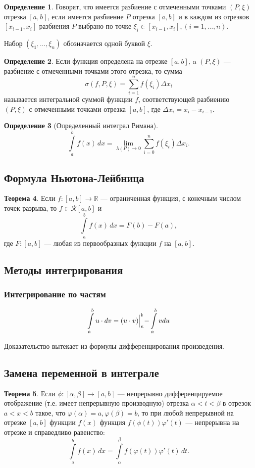 \documentclass[12pt]{report}
\theoremstyle{definition}
\newtheorem{theorem}{Теорема}[chapter]
\newtheorem{definition}[theorem]{Определение}
\newcommand{\R}{\mathbb R}
\newcommand{\Ri}{\mathcal R}
\begin{document}
\begin{definition}
Говорят, что имеется разбиение с отмеченными точками $(P, \xi)$ отрезка $[a, b]$,
если имеется разбиение $P$ отрезка $[a, b]$ и в каждом из отрезков $[x_{i-1}, x_i]$
разбиения $P$ выбрано по точке $\xi_i \in [x_{i-1}, x_i], (i=1, \dots, n)$.

Набор $(\xi_1, \dots, \xi_n)$ обозначается одной буквой $\xi$.
\end{definition}

\begin{definition}
Если функция определена на отрезке $[a, b]$, a $(P, \xi)$ --- разбиение с отмеченными
точками этого отрезка, то сумма
$$
\sigma(f, P, \xi) = \sum\limits_{i=1}^{n} f(\xi_i) \Delta x_i
$$
называется интегральной суммой функции $f$, соответствующей разбиению $(P, \xi)$
с отмеченными точками отрезка $[a, b]$, где $\Delta x_i = x_i - x_{i-1}$.
\end{definition}

\begin{definition}[Определенный интеграл Римана]
$$
\int\limits_{a}^{b} f(x) \, dx = \lim\limits_{\lambda(P) \rightarrow 0} \sum\limits_{i=0}^{n} f(\xi_i) \Delta x_i.
$$
\end{definition}

\subsection{Формула Ньютона-Лейбница}
\begin{theorem}
Если $f: [a, b] \rightarrow \R$ --- ограниченная функция, с конечным числом точек разрыва,
то $f \in \Ri [a, b]$ и
$$
\int\limits_a^b f(x)\,dx = F(b) - F(a),
$$
где $F: [a, b]$ --- любая из первообразных функции $f$ на $[a, b]$.
\end{theorem}

\subsection{Методы интегрирования}
\subsubsection{Интегрирование по частям}
$$
\int\limits_a^b u \cdot d v = (u\cdot v) \Bigl |_a^b - \int\limits_a^b v du
$$

Доказательство вытекает из формулы дифференцирования произведения.

\subsection{Замена переменной в интеграле}
\begin{theorem}
Если $\phi: [\alpha, \beta] \rightarrow [a, b]$ --- непрерывно дифференцируемое отображение
(т.е. имеет непрерывную производную) отрезка $\alpha < t < \beta$ в отрезок $a < x < b$ такое,
что $\varphi(\alpha) = a, \varphi(\beta) = b$, то при любой непрерывной на отрезке $[a, b]$ функции
$f(x)$ функция $f(\phi(t))\varphi'(t)$ --- непрерывна на отрезке и справедливо равенство:
$$
\int\limits_a^b f(x) \, dx = \int\limits_\alpha^\beta f(\varphi(t)) \varphi'(t)\, dt.
$$
\end{theorem}
\end{document}

